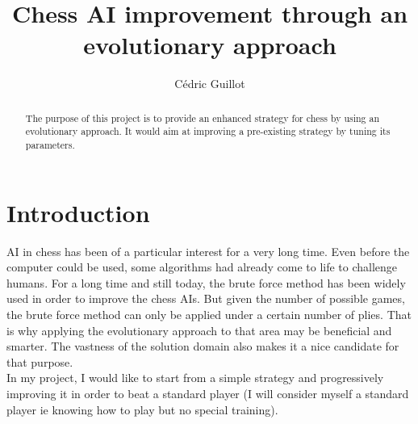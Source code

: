 \documentclass[runningheads]{llncs}
\begin{document}
\title{Chess AI improvement through an evolutionary approach}

\author{Cédric Guillot}


\maketitle


\begin{abstract} 
The purpose of this project is to provide an enhanced strategy for chess by using an evolutionary approach. It would aim at improving a pre-existing strategy by tuning its parameters.
\end{abstract}


\section{Introduction}
\label{sec:Introduction}
AI in chess has been of a particular interest for a very long time. Even before the computer could be used, some algorithms had already come to life to challenge humans. For a long time and still today, the brute force method has been widely used in order to improve the chess AIs. But given the number of possible games, the brute force method can only be applied under a certain number of plies. That is why applying the evolutionary approach to that area may be beneficial and smarter. The vastness of the solution domain also makes it a nice candidate for that purpose.\\

In my project, I would like to start from a simple strategy and progressively improving it in order to beat a standard player (I will consider myself a standard player ie knowing how to play but no special training).
\end{document}
